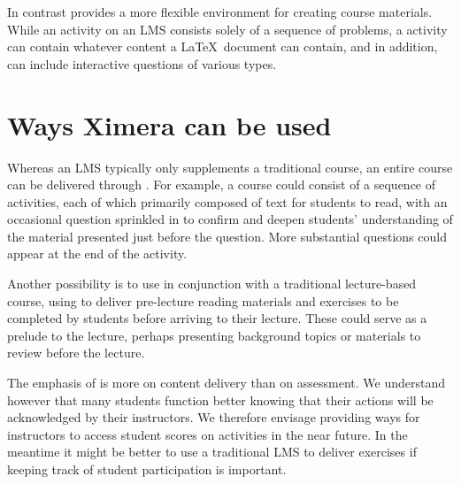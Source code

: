 \documentclass{ximera}
\begin{document}
In contrast  provides a more flexible environment for creating course materials.
While an activity on an LMS consists solely of a sequence of problems, a 
activity can contain whatever content a \LaTeX\ document can contain, and in addition, can include interactive questions
of various types.

\section{Ways Ximera can be used}
Whereas an LMS typically only supplements a traditional course, an entire course can be delivered through
.
For example, a course could consist of a sequence of  activities, each of which primarily composed of text for students to read, with an occasional question sprinkled in to confirm and deepen students'
understanding of the material presented just before the question.
More substantial questions could appear at the end of the activity.

Another possibility is to use  in conjunction with a traditional lecture-based course,
using  to deliver pre-lecture reading materials and exercises to be completed by students before arriving to their lecture.
These could serve as a prelude to the lecture, perhaps presenting background topics or materials
to review before the lecture.

The emphasis of  is more on content delivery than on assessment.
We understand however that many students function better knowing that their actions will be acknowledged by their instructors. We therefore envisage providing ways for instructors to access student scores on  activities in the near future. In the meantime it might be better to use a traditional LMS to deliver exercises
if keeping track of student participation is important.
\end{document}
